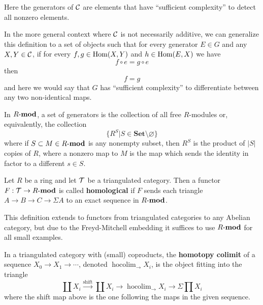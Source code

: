 \documentclass[12pt]{article}
\newcommand*{\Set}{\mathbf{Set}}
\begin{document}
\begin{rmk}
	Here the generators of $\mathcal{C}$ are elements that have ``sufficient complexity'' to detect all nonzero elements. 
	
	In the more general context where $\mathcal{C}$ is not necessarily additive, we can generalize this definition to a set of objects 
	such that for every generator $E\in G$ and any $X,Y\in\mathcal{C}$, if for every $f,g\in\operatorname{Hom}(X,Y)$ and $h\in\operatorname{Hom}(E,X)$ we have 
	\[f\circ e=g\circ e\]
	then 
	\[f=g\]
	and here we would say that $G$ has ``sufficient complexity'' to differentiate between any two non-identical maps.
\end{rmk}
\begin{ex}
	In $R\text{-}\mathbf{mod}$, a set of generators is the collection of all free $R$-modules or, equivalently, the collection 
	\[\{R^S|S\in\Set\setminus\varnothing\}\]
	where if $S\subset M\in R\text{-}\mathbf{mod}$ is any nonempty subset, then $R^S$ is the product of $|S|$ copies of $R$, 
	where a nonzero map to $M$ is the map which sends the identity in factor to a different $s\in S$.
\end{ex}
\begin{defn}\label{def-hom-func}
	Let $R$ be a ring and let $\mathcal{T}$ be a triangulated category. Then a functor $F:\mathcal{T}\to R\text{-}\mathbf{mod}$ is called \textbf{homological}
	if $F$ sends each triangle $A\to B\to C\to\Sigma A$ to an exact sequence in $R\text{-}\mathbf{mod}$.
\end{defn}
\begin{rmk}
	This definition extends to functors from triangulated categories to any Abelian category, but due to the Freyd-Mitchell
	embedding it suffices to use $R\text{-}\mathbf{mod}$ for all small examples.
\end{rmk}
\begin{defn}
	In a triangulated category with (small) coproducts, the \textbf{homotopy colimit} of a sequence $X_0\to X_1\to\cdots$, denoted $\operatorname{hocolim}_{\rightarrow}X_i$,
	is the object fitting into the triangle 
	\[\coprod X_i\xrightarrow{\text{shift}}\coprod X_i\to \operatorname{hocolim}_\rightarrow X_i \to\Sigma\prod X_i\]
	where the shift map above is the one following the maps in the given sequence.
\end{defn}
\end{document}
